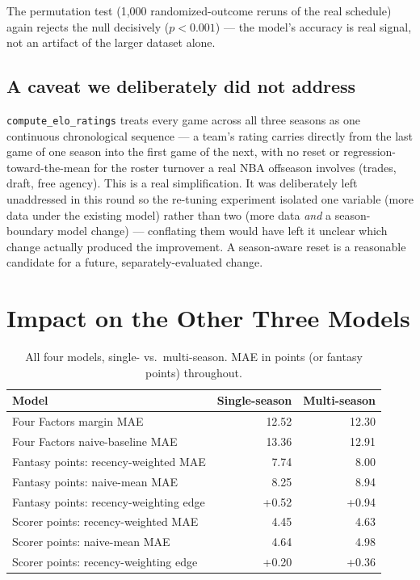 \documentclass[11pt]{article}
\newcommand{\code}[1]{\allowbreak\texttt{\small #1}\allowbreak}
\begin{document}
The permutation test (1,000 randomized-outcome reruns of the real schedule) again rejects the null decisively
($p < 0.001$) — the model's accuracy is real signal, not an artifact of the larger dataset alone.

\subsection{A caveat we deliberately did not address}

\code{compute\_elo\_ratings} treats every game across all three seasons as one continuous chronological
sequence — a team's rating carries directly from the last game of one season into the first game of the next,
with no reset or regression-toward-the-mean for the roster turnover a real NBA offseason involves (trades,
draft, free agency). This is a real simplification. It was deliberately left unaddressed in this round so the
re-tuning experiment isolated one variable (more data under the existing model) rather than two (more data
\emph{and} a season-boundary model change) — conflating them would have left it unclear which change actually
produced the improvement. A season-aware reset is a reasonable candidate for a future, separately-evaluated
change.

\section{Impact on the Other Three Models}

\begin{table}[h]
\centering
\small
\begin{tabular}{lrr}
\toprule
Model & Single-season & Multi-season \\
\midrule
Four Factors margin MAE & 12.52 & 12.30 \\
Four Factors naive-baseline MAE & 13.36 & 12.91 \\
Fantasy points: recency-weighted MAE & 7.74 & 8.00 \\
Fantasy points: naive-mean MAE & 8.25 & 8.94 \\
Fantasy points: recency-weighting edge & +0.52 & +0.94 \\
Scorer points: recency-weighted MAE & 4.45 & 4.63 \\
Scorer points: naive-mean MAE & 4.64 & 4.98 \\
Scorer points: recency-weighting edge & +0.20 & +0.36 \\
\bottomrule
\end{tabular}
\caption{All four models, single- vs.\ multi-season. MAE in points (or fantasy points) throughout.}
\end{table}
\end{document}
